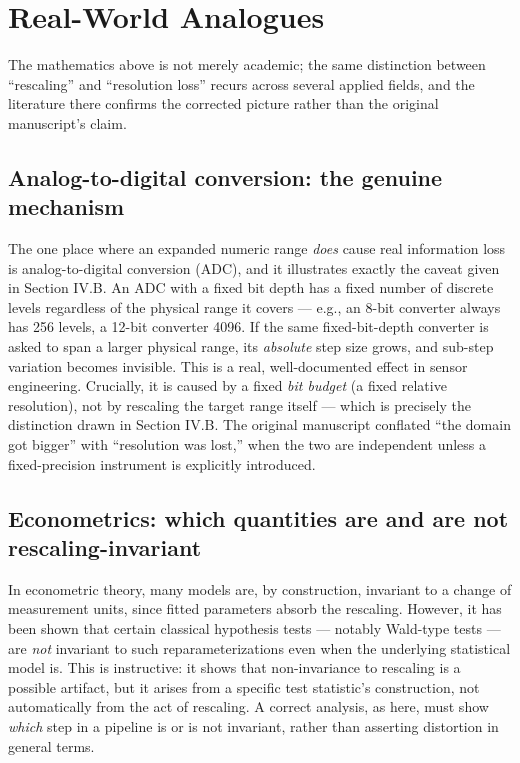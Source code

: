 \documentclass[10pt,journal,compsoc]{IEEEtran}
\begin{document}
\section{Real-World Analogues}
The mathematics above is not merely academic; the same distinction between ``rescaling'' and ``resolution loss'' recurs across several applied fields, and the literature there confirms the corrected picture rather than the original manuscript's claim.

\subsection{Analog-to-digital conversion: the genuine mechanism}
The one place where an expanded numeric range \emph{does} cause real information loss is analog-to-digital conversion (ADC), and it illustrates exactly the caveat given in Section IV.B. An ADC with a fixed bit depth has a fixed number of discrete levels regardless of the physical range it covers — e.g., an 8-bit converter always has 256 levels, a 12-bit converter 4096. If the same fixed-bit-depth converter is asked to span a larger physical range, its \emph{absolute} step size grows, and sub-step variation becomes invisible. This is a real, well-documented effect in sensor engineering. Crucially, it is caused by a fixed \emph{bit budget} (a fixed relative resolution), not by rescaling the target range itself — which is precisely the distinction drawn in Section IV.B. The original manuscript conflated ``the domain got bigger'' with ``resolution was lost,'' when the two are independent unless a fixed-precision instrument is explicitly introduced.

\subsection{Econometrics: which quantities are and are not rescaling-invariant}
In econometric theory, many models are, by construction, invariant to a change of measurement units, since fitted parameters absorb the rescaling. However, it has been shown that certain classical hypothesis tests — notably Wald-type tests — are \emph{not} invariant to such reparameterizations even when the underlying statistical model is. This is instructive: it shows that non-invariance to rescaling is a possible artifact, but it arises from a specific test statistic's construction, not automatically from the act of rescaling. A correct analysis, as here, must show \emph{which} step in a pipeline is or is not invariant, rather than asserting distortion in general terms.
\end{document}
